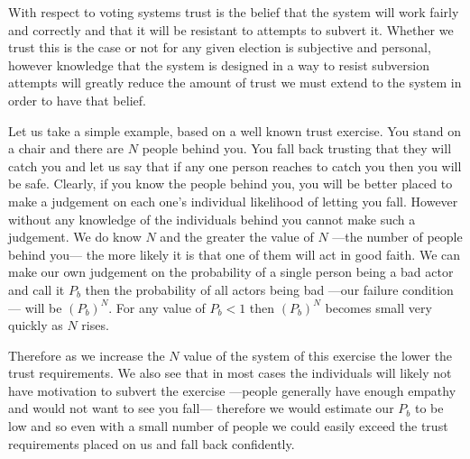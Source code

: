 With respect to voting systems trust is the belief that the system will work fairly and correctly and that it will be resistant to attempts to subvert it. Whether we trust this is the case or not for any given election is subjective and personal, however knowledge that the system is designed in a way to resist subversion attempts will greatly reduce the amount of trust we must extend to the system in order to have that belief.

Let us take a simple example, based on a well known trust exercise. You stand on a chair and there are $N$ people behind you. You fall back trusting that they will catch you and let us say that if any one person reaches to catch you then you will be safe. Clearly, if you know the people behind you, you will be better placed to make a judgement on each one's individual likelihood of letting you fall. However without any knowledge of the individuals behind you cannot make such a judgement. We do know $N$ and the greater the value of $N$ ---the number of people behind you--- the more likely it is that one of them will act in good faith. We can make our own judgement on the probability of a single person being a bad actor and call it $P_b$ then the probability of all actors being bad ---our failure condition--- will be $(P_b)^N$. For any value of $P_b < 1$ then $(P_b)^N$ becomes small very quickly as $N$ rises.

Therefore as we increase the $N$ value of the system of this exercise the lower the trust requirements. We also see that in most cases the individuals will likely not have motivation to subvert the exercise ---people generally have enough empathy and would not want to see you fall--- therefore we would estimate our $P_b$ to be low and so even with a small number of people we could easily exceed the trust requirements placed on us and fall back confidently.


